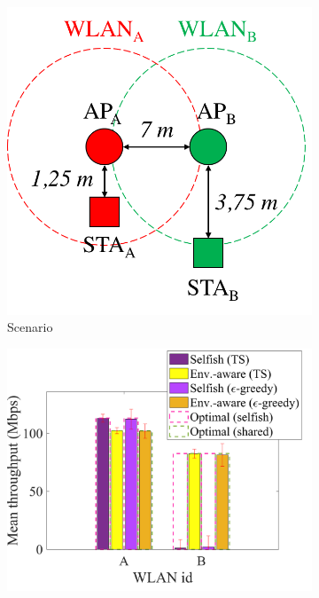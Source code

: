 \documentclass{article}
\begin{document}
\begin{figure}[h!]
	\centering   		
	\begin{subfigure}[b]{0.26\textwidth}
		\includegraphics[width=\textwidth]{s1_new}
		\caption{Scenario}
		\label{fig:s1_new}
	\end{subfigure}
	\begin{subfigure}[b]{0.36\linewidth}
		\includegraphics[width=\textwidth]{fig_2_1_fairness}

\end{subfigure}
\end{figure}
\end{document}
